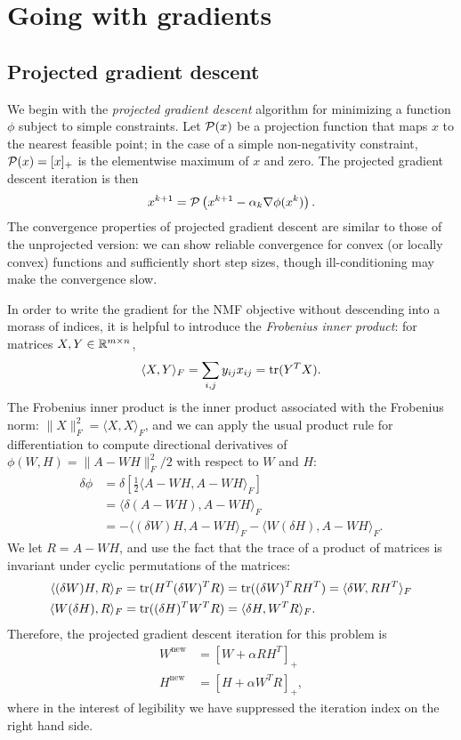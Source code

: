 \documentclass[12pt, leqno]{article} %
\begin{document}
\section{Going with gradients}

\subsection{Projected gradient descent}

We begin with the {\em projected gradient descent} algorithm for
minimizing a function $\phi$ subject to simple constraints.
Let $\mathcal{P}(x)$ be a projection function that maps $x$ to the
nearest feasible point; in the case of a simple non-negativity
constraint, $\mathcal{P}(x) = [x]_+$ is the elementwise maximum of $x$ and
zero.  The projected gradient descent iteration is then
\[
  x^{k+1} = \mathcal{P}\left( x^{k+1} - \alpha_k \nabla \phi(x^k) \right).
\]
The convergence properties of projected gradient descent are similar
to those of the unprojected version: we can show reliable
convergence for convex (or locally convex) functions and sufficiently
short step sizes, though ill-conditioning may make the convergence slow.

In order to write the gradient for the NMF objective without
descending into a morass of indices, it is helpful to introduce
the {\em Frobenius inner product}: for matrices
$X, Y \in \mathbb{R}^{m \times n}$,
\[
  \langle X, Y \rangle_F =
  \sum_{i,j} y_{ij} x_{ij} =
  \operatorname{tr}(Y^T X).
\]
The Frobenius inner product is the inner product associated with the
Frobenius norm: $\|X\|_F^2 = \langle X, X \rangle_F$, and we can apply
the usual product rule for differentiation to compute directional
derivatives of $\phi(W,H) = \|A-WH\|_F^2/2$ with respect to $W$ and $H$:
\begin{align*}
  \delta \phi
  &= \delta \left[ \frac{1}{2} \langle A-WH, A-WH \rangle_F \right] \\
  &= \langle \delta(A-WH), A-WH \rangle_F \\
  &= -\langle (\delta W) H, A-WH \rangle_F
     -\langle W (\delta H), A-WH \rangle_F.
\end{align*}
We let $R = A-WH$, and use the fact that the trace of a product
of matrices is invariant under cyclic permutations of the matrices:
\begin{align*}
  \langle (\delta W) H, R \rangle_F
  & = \operatorname{tr}(H^T (\delta W)^T R)
    = \operatorname{tr}((\delta W)^T RH^T)
    = \langle \delta W, RH^T \rangle_F \\
  \langle W (\delta H), R \rangle_F
  &= \operatorname{tr}((\delta H)^T W^T R) = \langle \delta H, W^T R \rangle_F.
\end{align*}
Therefore, the projected gradient descent iteration for this
problem is
\begin{align*}
  W^{\mathrm{new}} &=
  \left[
    W + \alpha RH^T 
  \right]_+ \\
  H^{\mathrm{new}} &=
  \left[
    H + \alpha W^T R
  \right]_+,
\end{align*}
where in the interest of legibility we have suppressed the iteration
index on the right hand side.
\end{document}
